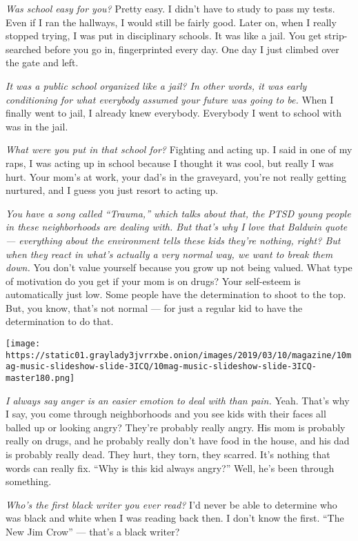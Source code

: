\emph{Was school easy for you?} Pretty easy. I didn't have to study to
pass my tests. Even if I ran the hallways, I would still be fairly good.
Later on, when I really stopped trying, I was put in disciplinary
schools. It was like a jail. You get strip-searched before you go in,
fingerprinted every day. One day I just climbed over the gate and left.

\emph{It was a public school organized like a jail? In other words, it
was early conditioning for what everybody assumed your future was going
to be.} When I finally went to jail, I already knew everybody. Everybody
I went to school with was in the jail.

\emph{What were you put in that school for?} Fighting and acting up. I
said in one of my raps, I was acting up in school because I thought it
was cool, but really I was hurt. Your mom's at work, your dad's in the
graveyard, you're not really getting nurtured, and I guess you just
resort to acting up.

\emph{You have a song called ``Trauma,'' which talks about that, the
PTSD young people in these neighborhoods are dealing with. But that's
why I love that Baldwin quote --- everything about the environment tells
these kids they're nothing, right? But when they react in what's
actually a very normal way, we want to break them down.} You don't value
yourself because you grow up not being valued. What type of motivation
do you get if your mom is on drugs? Your self-esteem is automatically
just low. Some people have the determination to shoot to the top. But,
you know, that's not normal --- for just a regular kid to have the
determination to do that.

\texttt{[image: https://static01.graylady3jvrrxbe.onion/images/2019/03/10/magazine/10mag-music-slideshow-slide-3ICQ/10mag-music-slideshow-slide-3ICQ-master180.png]}

\emph{I always say anger is an easier emotion to deal with than pain.}
Yeah. That's why I say, you come through neighborhoods and you see kids
with their faces all balled up or looking angry? They're probably really
angry. His mom is probably really on drugs, and he probably really don't
have food in the house, and his dad is probably really dead. They hurt,
they torn, they scarred. It's nothing that words can really fix. ``Why
is this kid always angry?'' Well, he's been through something.

\emph{Who's the first black writer you ever read?} I'd never be able to
determine who was black and white when I was reading back then. I don't
know the first. ``The New Jim Crow'' --- that's a black writer?

